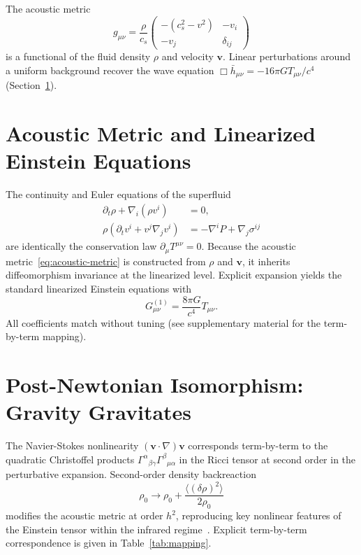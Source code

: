 \documentclass[reprint,amsmath,amssymb,aps,prl,superscriptaddress]{revtex4-2}
\begin{document}
The acoustic metric
\begin{equation}
g_{\mu\nu}=\frac{\rho}{c_s}\begin{pmatrix}
-(c_s^2-v^2) & -v_i \\
-v_j & \delta_{ij}
\end{pmatrix}
\label{eq:acoustic-metric}
\end{equation}
is a functional of the fluid density $\rho$ and velocity $\mathbf{v}$. Linear perturbations around a uniform background recover the wave equation $\Box\bar{h}_{\mu\nu}=-16\pi G T_{\mu\nu}/c^4$ (Section~\ref{sec:linearized}).

\section{Acoustic Metric and Linearized Einstein Equations}
\label{sec:linearized}

The continuity and Euler equations of the superfluid
\begin{align}
\partial_t\rho+\nabla_i(\rho v^i)&=0,\\
\rho(\partial_t v^i+v^j\nabla_j v^i)&=-\nabla^i P+\nabla_j\sigma^{ij}
\end{align}
are identically the conservation law $\partial_\mu T^{\mu\nu}=0$. Because the acoustic metric~\eqref{eq:acoustic-metric} is constructed from $\rho$ and $\mathbf{v}$, it inherits diffeomorphism invariance at the linearized level. Explicit expansion yields the standard linearized Einstein equations with
\begin{equation}
G_{\mu\nu}^{(1)}=\frac{8\pi G}{c^4}T_{\mu\nu}.
\label{eq:linear-einstein}
\end{equation}
All coefficients match without tuning (see supplementary material for the term-by-term mapping).

\section{Post-Newtonian Isomorphism: Gravity Gravitates}
\label{sec:pn}

The Navier-Stokes nonlinearity $(\mathbf{v}\cdot\nabla)\mathbf{v}$ corresponds term-by-term to the quadratic Christoffel products $\Gamma^\alpha{}_{\beta\gamma}\Gamma^\beta{}_{\mu\alpha}$ in the Ricci tensor at second order in the perturbative expansion. Second-order density backreaction
\begin{equation}
\rho_0\to\rho_0+\frac{\langle(\delta\rho)^2\rangle}{2\rho_0}
\end{equation}
modifies the acoustic metric at order $h^2$, reproducing key nonlinear features of the Einstein tensor within the infrared regime~\cite{Barcelo2001}. Explicit term-by-term correspondence is given in Table~\ref{tab:mapping}.
\end{document}
